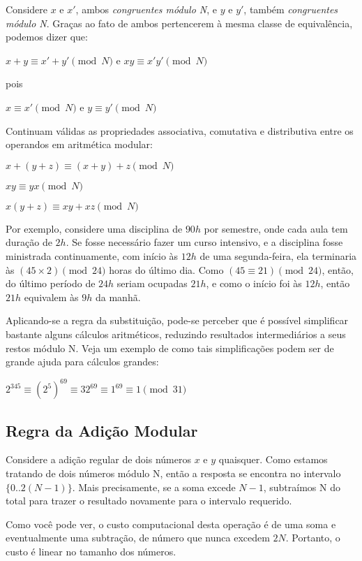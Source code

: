 Considere $x$ e $x'$, ambos \textit{congruentes módulo N}, e $y$ e
$y'$, também \textit{congruentes módulo N}. Graças ao fato de ambos
pertencerem à mesma classe de equivalência, podemos dizer que:

$x+y \equiv x'+y' \pmod N$ e $xy \equiv x'y' \pmod N$

pois

$x \equiv x' \pmod N$ e $y \equiv y' \pmod N$

\vspace{1em}
Continuam válidas as propriedades associativa, comutativa e distributiva entre
os operandos em aritmética modular:

$x+(y+z) \equiv (x+y)+z \pmod N$

$xy \equiv yx \pmod N$

$x(y+z) \equiv xy+xz \pmod N$

\vspace{1em}
Por exemplo, considere uma disciplina de $90h$ por semestre, onde cada aula
tem duração de $2h$. Se fosse necessário fazer um curso intensivo, e a
disciplina fosse ministrada continuamente, com início às $12h$ de uma
segunda-feira, ela terminaria às $(45 \times 2)\pmod{24}$ horas do último dia.
Como $(45 \equiv 21) \pmod{24}$, então, do último período de $24h$ seriam
ocupadas $21h$, e como o início foi às $12h$, então $21h$ equivalem às $9h$ da
manhã.

Aplicando-se a regra da substituição, pode-se perceber que é possível
simplificar bastante alguns cálculos aritméticos, reduzindo resultados
intermediários a seus restos módulo N. Veja um exemplo de como tais
simplificações podem ser de grande ajuda para cálculos grandes:

$2^{345} \equiv (2^5)^{69} \equiv 32^{69} \equiv 1^{69} \equiv 1 \pmod{31}$


\vspace{1.5em}
\subsection*{Regra da Adição Modular}

Considere a adição regular de dois números $x$ e $y$ quaisquer. Como estamos
tratando de dois números módulo N, então a resposta se encontra no intervalo
$\{0..2(N-1)\}$. Mais precisamente, se a soma excede $N-1$, subtraímos N do total
para trazer o resultado novamente para o intervalo requerido.

Como você pode ver, o custo computacional desta operação é de uma soma e
eventualmente uma subtração, de número que nunca excedem $2N$. Portanto, o
custo é linear no tamanho dos números.

